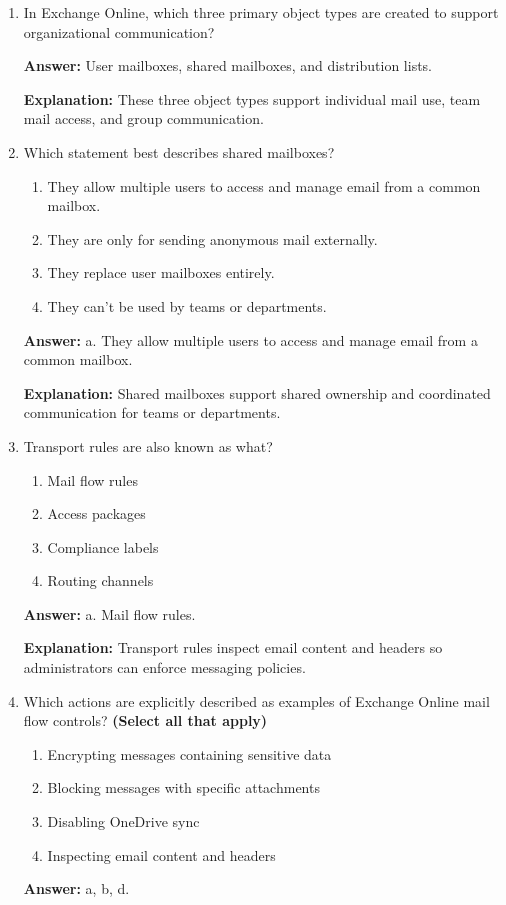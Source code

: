 \documentclass[10pt]{article}
\begin{document}
\begin{enumerate}[leftmargin=*]
\textbf{Explanation:} Exchange Online includes built-in protections for malware, spam, and sensitive data handling.

\item In Exchange Online, which three primary object types are created to support organizational communication?

\textbf{Answer:} User mailboxes, shared mailboxes, and distribution lists.

\textbf{Explanation:} These three object types support individual mail use, team mail access, and group communication.

\item Which statement best describes shared mailboxes?
\begin{enumerate}[label=\alph*., leftmargin=1.5em]
\item They allow multiple users to access and manage email from a common mailbox.
\item They are only for sending anonymous mail externally.
\item They replace user mailboxes entirely.
\item They can’t be used by teams or departments.
\end{enumerate}
\textbf{Answer:} a. They allow multiple users to access and manage email from a common mailbox.

\textbf{Explanation:} Shared mailboxes support shared ownership and coordinated communication for teams or departments.

\item Transport rules are also known as what?
\begin{enumerate}[label=\alph*., leftmargin=1.5em]
\item Mail flow rules
\item Access packages
\item Compliance labels
\item Routing channels
\end{enumerate}
\textbf{Answer:} a. Mail flow rules.

\textbf{Explanation:} Transport rules inspect email content and headers so administrators can enforce messaging policies.

\item Which actions are explicitly described as examples of Exchange Online mail flow controls? \textbf{(Select all that apply)}
\begin{enumerate}[label=\alph*., leftmargin=1.5em]
\item Encrypting messages containing sensitive data
\item Blocking messages with specific attachments
\item Disabling OneDrive sync
\item Inspecting email content and headers
\end{enumerate}
\textbf{Answer:} a, b, d.


\end{enumerate}
\end{document}
